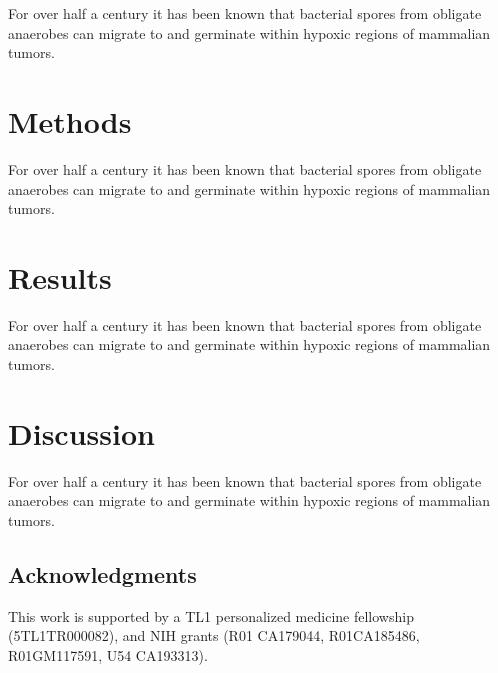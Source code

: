 \documentclass[twocolumn,11pt]{article}
\begin{document}
For over half a century it has been known that bacterial spores from obligate anaerobes can migrate to and germinate within hypoxic regions of mammalian tumors.~\cite{malmgren1955localization}


\section{Methods}

For over half a century it has been known that bacterial spores from obligate anaerobes can migrate to and germinate within hypoxic regions of mammalian tumors.~\cite{malmgren1955localization}


\section{Results}

For over half a century it has been known that bacterial spores from obligate anaerobes can migrate to and germinate within hypoxic regions of mammalian tumors.~\cite{malmgren1955localization}


\section{Discussion}

For over half a century it has been known that bacterial spores from obligate anaerobes can migrate to and germinate within hypoxic regions of mammalian tumors.~\cite{malmgren1955localization}


\subsection*{Acknowledgments}

This work is supported by a TL1 personalized medicine fellowship (5TL1TR000082), and NIH grants (R01 CA179044, R01CA185486, R01GM117591, U54 CA193313).



\end{document}
